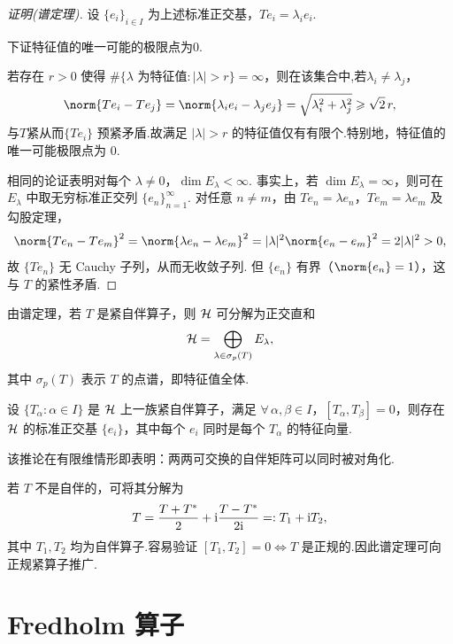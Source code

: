 \begin{proof}[证明(谱定理)]
 设 $\{e_i\}_{i\in I}$ 为上述标准正交基，$Te_i = \lambda_i e_i$.\par
下证特征值的唯一可能的极限点为$0$.\par
若存在 $r>0$ 使得 $\#\{\lambda\text{ 为特征值}: |\lambda|>r\} = \infty$，则在该集合中,若$\lambda_i\neq\lambda_j$，
\begin{equation*}
\norm{Te_i - Te_j} = \norm{\lambda_i e_i - \lambda_j e_j} = \sqrt{\lambda_i^2 + \lambda_j^2} \geq \sqrt{2}\,r,
\end{equation*}
与$T$紧从而$\{Te_i\}$ 预紧矛盾.故满足 $|\lambda|>r$ 的特征值仅有有限个.特别地，特征值的唯一可能极限点为 $0$.\par
相同的论证表明对每个 $\lambda\neq0$，$\dim E_\lambda<\infty$. 事实上，若 $\dim E_\lambda=\infty$，则可在 $E_\lambda$ 中取无穷标准正交列 $\{e_n\}_{n=1}^\infty$. 对任意 $n\neq m$，由 $Te_n=\lambda e_n$，$Te_m=\lambda e_m$ 及勾股定理，
    \begin{equation*}
    \norm{Te_n - Te_m}^2 = \norm{\lambda e_n - \lambda e_m}^2 = |\lambda|^2\norm{e_n - e_m}^2 = 2|\lambda|^2 > 0,
    \end{equation*}
    故 $\{Te_n\}$ 无 Cauchy 子列，从而无收敛子列. 但 $\{e_n\}$ 有界（$\norm{e_n}=1$），这与 $T$ 的紧性矛盾.
\end{proof}

由谱定理，若 $T$ 是紧自伴算子，则 $\mathcal{H}$ 可分解为正交直和
\begin{equation*}
\mathcal{H} = \bigoplus_{\lambda\in\sigma_p(T)} E_\lambda,
\end{equation*}
其中 $\sigma_p(T)$ 表示 $T$ 的点谱，即特征值全体.

\begin{corollary}\label{cor:commuting-selfadjoint}
设 $\{T_\alpha: \alpha\in I\}$ 是 $\mathcal{H}$ 上一族紧自伴算子，满足 $\forall\,\alpha,\beta\in I$，$[T_\alpha, T_\beta] = 0$，则存在 $\mathcal{H}$ 的标准正交基 $\{e_i\}$，其中每个 $e_i$ 同时是每个 $T_\alpha$ 的特征向量.
\end{corollary}

该推论在有限维情形即表明：两两可交换的自伴矩阵可以同时被对角化.\par
若 $T$ 不是自伴的，可将其分解为
\begin{equation*}
T = \frac{T+T^*}{2} + \mathrm{i}\frac{T-T^*}{2\mathrm{i}} =: T_1 + \mathrm{i} T_2,
\end{equation*}
其中 $T_1,T_2$ 均为自伴算子.容易验证 $[T_1, T_2] = 0 \Leftrightarrow T\text{ 是正规的}$.因此谱定理可向正规紧算子推广.

\section{Fredholm 算子}

